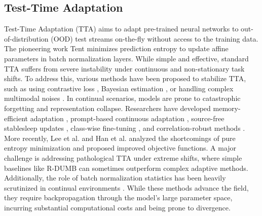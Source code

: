 \documentclass{article}
\theoremstyle{plain}
\theoremstyle{definition}
\theoremstyle{remark}
\begin{document}
\subsection{Test-Time Adaptation}
Test-Time Adaptation (TTA) aims to adapt pre-trained neural networks to out-of-distribution (OOD) test streams on-the-fly without access to the training data. The pioneering work Tent \cite{wang2021tent, wang2021tentfully} minimizes prediction entropy to update affine parameters in batch normalization layers. While simple and effective, standard TTA suffers from severe instability under continuous and non-stationary task shifts. To address this, various methods have been proposed to stabilize TTA, such as using contrastive loss \cite{chen2022contrastivetesttime}, Bayesian estimation \cite{zhou2025bayesiantesttime}, or handling complex multimodal noises \cite{guo2025smoothingshift}. 
In continual scenarios, models are prone to catastrophic forgetting and representation collapse. Researchers have developed memory-efficient adaptation \cite{song2023ecottamemoryefficient}, prompt-based continuous adaptation \cite{gan2022decoratenewcomers}, source-free stablesleep updates \cite{arasu2025stablesleepsourcefree}, class-wise fine-tuning \cite{zhao2025cftaclasswise}, and correlation-robust methods \cite{gong2022noterobust}. More recently, Lee et al. \cite{lee2024entropyis, lee2024becottainputdependent} and Han et al. \cite{han2025rankedentropy} analyzed the shortcomings of pure entropy minimization and proposed improved objective functions. 
A major challenge is addressing pathological TTA under extreme shifts, where simple baselines like R-DUMB \cite{press2023rdumbsimple, mishra2026rdumbdriftaware} can sometimes outperform complex adaptive methods. Additionally, the role of batch normalization statistics has been heavily scrutinized in continual environments \cite{lange2023batchnormalization, shao2025investigationtesttime}. While these methods advance the field, they require backpropagation through the model's large parameter space, incurring substantial computational costs and being prone to divergence.
\end{document}
